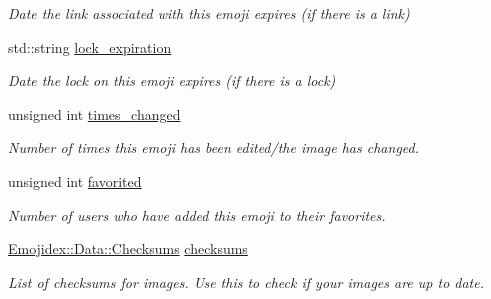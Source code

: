 \begin{DoxyCompactItemize}
\begin{DoxyCompactList}\small\item\em Date the link associated with this emoji expires (if there is a link) \end{DoxyCompactList}\item 
std\+::string \hyperlink{classEmojidex_1_1Data_1_1Emoji_ab89f5f4534ea2f04093a314304514786}{lock\+\_\+expiration}\hypertarget{classEmojidex_1_1Data_1_1Emoji_ab89f5f4534ea2f04093a314304514786}{}\label{classEmojidex_1_1Data_1_1Emoji_ab89f5f4534ea2f04093a314304514786}

\begin{DoxyCompactList}\small\item\em Date the lock on this emoji expires (if there is a lock) \end{DoxyCompactList}\item 
unsigned int \hyperlink{classEmojidex_1_1Data_1_1Emoji_a259f6b01221b548c048612b1c73cdf95}{times\+\_\+changed}\hypertarget{classEmojidex_1_1Data_1_1Emoji_a259f6b01221b548c048612b1c73cdf95}{}\label{classEmojidex_1_1Data_1_1Emoji_a259f6b01221b548c048612b1c73cdf95}

\begin{DoxyCompactList}\small\item\em Number of times this emoji has been edited/the image has changed. \end{DoxyCompactList}\item 
unsigned int \hyperlink{classEmojidex_1_1Data_1_1Emoji_ace2b4c0ce6c36f8b8562f2494aa4c306}{favorited}\hypertarget{classEmojidex_1_1Data_1_1Emoji_ace2b4c0ce6c36f8b8562f2494aa4c306}{}\label{classEmojidex_1_1Data_1_1Emoji_ace2b4c0ce6c36f8b8562f2494aa4c306}

\begin{DoxyCompactList}\small\item\em Number of users who have added this emoji to their favorites. \end{DoxyCompactList}\item 
\hyperlink{classEmojidex_1_1Data_1_1Checksums}{Emojidex\+::\+Data\+::\+Checksums} \hyperlink{classEmojidex_1_1Data_1_1Emoji_aa0c2638f3d68e538a247e22ad70f6255}{checksums}\hypertarget{classEmojidex_1_1Data_1_1Emoji_aa0c2638f3d68e538a247e22ad70f6255}{}\label{classEmojidex_1_1Data_1_1Emoji_aa0c2638f3d68e538a247e22ad70f6255}

\begin{DoxyCompactList}\small\item\em List of checksums for images. Use this to check if your images are up to date. \end{DoxyCompactList}\end{DoxyCompactItemize}


